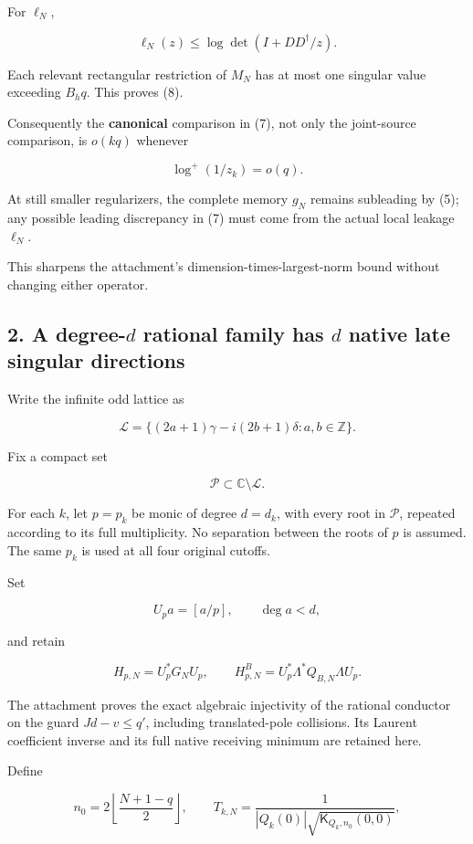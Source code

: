 \documentclass[11pt]{article}
\begin{document}
For \(\ell_N\),

\[
\ell_N(z)
\le\log\det(I+DD^\dagger/z).
\]

Each relevant rectangular restriction of \(M_N\) has at most one singular value exceeding \(B_hq\). This proves (8).

Consequently the \textbf{canonical} comparison in (7), not only the joint-source comparison, is \(o(kq)\) whenever

\[
\log^+(1/z_k)=o(q).
\tag{9}
\]

At still smaller regularizers, the complete memory \(g_N\) remains subleading by (5); any possible leading discrepancy in (7) must come from the actual local leakage \(\ell_N\).

This sharpens the attachment's dimension-times-largest-norm bound without changing either operator.

\subsection{\texorpdfstring{2. A degree-\(d\) rational family has \(d\) native late singular directions}{2. A degree-d rational family has d native late singular directions}}\label{a-degree-d-rational-family-has-d-native-late-singular-directions}

Write the infinite odd lattice as

\[
\mathscr L
=
\{(2a+1)\gamma-i(2b+1)\delta:a,b\in\mathbb Z\}.
\]

Fix a compact set

\[
\mathscr P\subset\mathbb C\setminus\mathscr L.
\]

For each \(k\), let \(p=p_k\) be monic of degree \(d=d_k\), with every root in \(\mathscr P\), repeated according to its full multiplicity. No separation between the roots of \(p\) is assumed. The same \(p_k\) is used at all four original cutoffs.

Set

\[
U_pa=[a/p],\qquad \deg a<d,
\]

and retain

\[
H_{p,N}=U_p^*G_NU_p,\qquad
H^B_{p,N}=U_p^*\Lambda^*Q_{B,N}\Lambda U_p.
\tag{10}
\]

The attachment proves the exact algebraic injectivity of the rational conductor on the guard \(Jd-v\le q'\), including translated-pole collisions. Its Laurent coefficient inverse and its full native receiving minimum are retained here.

Define

\[
n_0=2\left\lfloor\frac{N+1-q}{2}\right\rfloor,
\qquad
T_{k,N}
=
\frac{1}
{|Q_k(0)|\sqrt{\mathsf K_{Q_k,n_0}(0,0)}},
\tag{11}
\]
\end{document}
